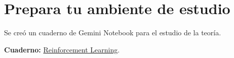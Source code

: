 \section{Prepara tu ambiente de estudio}

Se creó un cuaderno de Gemini Notebook para el estudio de la teoría.

\textbf{Cuaderno:} \href{https://notebook.google.com/notebook/8bf2a3c1-30c0-4903-87f0-df1480e8fe7c}{Reinforcement Learning}.\\

